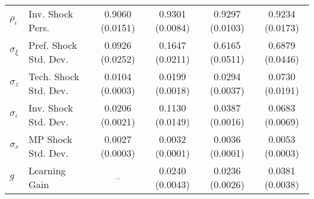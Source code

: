 \documentclass{beamer}
\newcommand{\hl}[1]{\alt<#1>{\rowcolor{light}\hspace*{-2.1pt}} {\hspace*{-2.1pt}} }
\begin{document}
{\begin{center}
\begin{tabular}{ll|c|c|c|c}
$\rho_{\iota}$ & Inv. Shock Pers. & 0.9060 (0.0151) & 0.9301 (0.0084) & 0.9297 (0.0103) & 0.9234 (0.0173) \\  
$\sigma_{\xi}$ & Pref. Shock Std. Dev. & 0.0926 (0.0252) & 0.1647 (0.0211) & 0.6165 (0.0511) & 0.6879 (0.0446) \\  
$\sigma_{z}$ & Tech. Shock Std. Dev. & 0.0104 (0.0003) & 0.0199 (0.0018) & 0.0294 (0.0037) & 0.0730 (0.0191) \\  
$\sigma_{\iota}$ & Inv. Shock Std. Dev. & 0.0206 (0.0021) & 0.1130 (0.0149) & 0.0387 (0.0016) & 0.0683 (0.0069) \\  
$\sigma_{r}$ & MP Shock Std. Dev. & 0.0027 (0.0003) & 0.0032 (0.0001) & 0.0036 (0.0001) & 0.0053 (0.0003) \\  
\hl{2}
$g$ & Learning Gain & --  & 0.0240 (0.0043) & 0.0236 (0.0026) & 0.0381 (0.0038) \\ \hline 
\end{tabular}
\end{center}
\normalsize
{}
}
\end{document}
